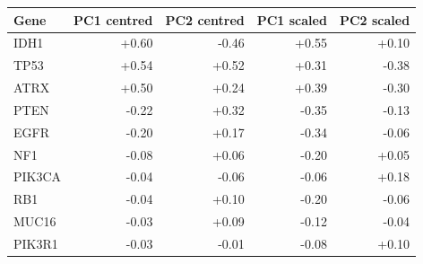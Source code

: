 \begin{tabular}{lrrrr}
\toprule
\textbf{Gene} & \textbf{PC1 centred} & \textbf{PC2 centred} & \textbf{PC1 scaled} & \textbf{PC2 scaled} \\
\midrule
IDH1 & +0.60 & -0.46 & +0.55 & +0.10 \\
TP53 & +0.54 & +0.52 & +0.31 & -0.38 \\
ATRX & +0.50 & +0.24 & +0.39 & -0.30 \\
PTEN & -0.22 & +0.32 & -0.35 & -0.13 \\
EGFR & -0.20 & +0.17 & -0.34 & -0.06 \\
NF1 & -0.08 & +0.06 & -0.20 & +0.05 \\
PIK3CA & -0.04 & -0.06 & -0.06 & +0.18 \\
RB1 & -0.04 & +0.10 & -0.20 & -0.06 \\
MUC16 & -0.03 & +0.09 & -0.12 & -0.04 \\
PIK3R1 & -0.03 & -0.01 & -0.08 & +0.10 \\
\bottomrule
\end{tabular}
